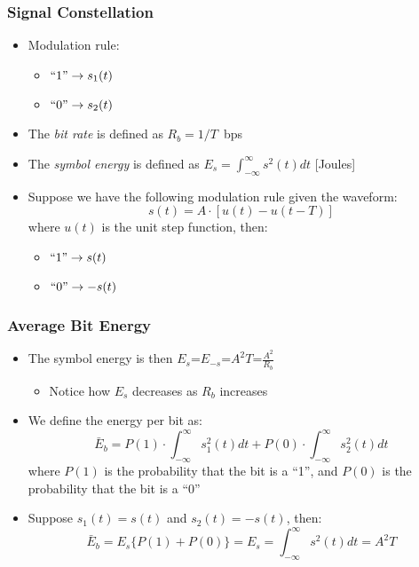 \documentclass[10pt]{beamer}
\begin{document}
\frame
{
  \frametitle{Signal Constellation}

  \begin{itemize}
  \item Modulation rule:
  \begin{itemize}
    \item $``1"\rightarrow s_{1}(t)$
    \item $``0"\rightarrow s_{2}(t)$
  \end{itemize}
  \item The {\it bit rate} is defined as $R_{b}=1/T$~bps
  \item The {\it symbol energy} is defined as $E_{s}=\int_{-\infty}^{\infty}s^2(t)dt$ [Joules]
  \item Suppose we have the following modulation rule given the waveform:
  \begin{equation}
    s(t)=A\cdot[u(t)-u(t-T)]
  \end{equation}
  where $u(t)$ is the unit step function, then:
  \begin{itemize}
    \item $``1"\rightarrow{s(t)}$
    \item $``0"\rightarrow{-s(t)}$
  \end{itemize}
  \end{itemize}

}
\frame
{
  \frametitle{Average Bit Energy}

  \begin{itemize}
  \item The symbol energy is then $E_{s}$=$E_{-s}$=$A^2T$=$\frac{A^2}{R_b}$
    \begin{itemize}
        \item Notice how $E_{s}$ decreases as $R_{b}$ increases
    \end{itemize}
  \item We define the energy per bit as:
  \begin{equation}
    \bar{E}_{b}=P(1)\cdot\int_{-\infty}^{\infty}s_{1}^2(t)dt+P(0)\cdot\int_{-\infty}^{\infty}s_{2}^2(t)dt
  \end{equation}
  where $P(1)$ is the probability that the bit is a ``1'', and $P(0)$ is the probability that the bit is a ``0''
  \item Suppose $s_{1}(t)=s(t)$ and $s_{2}(t)=-s(t)$, then:
  \begin{equation}
    \bar{E}_{b}=E_{s}\{P(1)+P(0)\}=E_{s}=\int_{-\infty}^{\infty}s^2(t)dt=A^2T
  \end{equation}
  \end{itemize}

}
\end{document}
